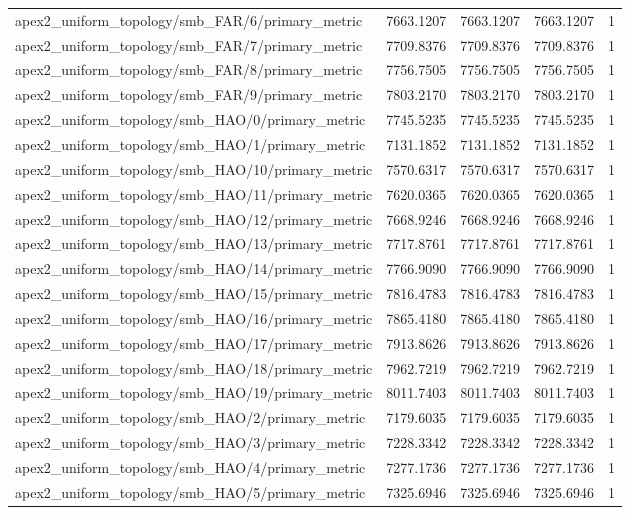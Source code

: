 \begin{table}[h]
\begin{tabular}{lrrrr}
apex2_uniform_topology/smb_FAR/6/primary_metric & 7663.1207 & 7663.1207 & 7663.1207 & 1 \\
apex2_uniform_topology/smb_FAR/7/primary_metric & 7709.8376 & 7709.8376 & 7709.8376 & 1 \\
apex2_uniform_topology/smb_FAR/8/primary_metric & 7756.7505 & 7756.7505 & 7756.7505 & 1 \\
apex2_uniform_topology/smb_FAR/9/primary_metric & 7803.2170 & 7803.2170 & 7803.2170 & 1 \\
apex2_uniform_topology/smb_HAO/0/primary_metric & 7745.5235 & 7745.5235 & 7745.5235 & 1 \\
apex2_uniform_topology/smb_HAO/1/primary_metric & 7131.1852 & 7131.1852 & 7131.1852 & 1 \\
apex2_uniform_topology/smb_HAO/10/primary_metric & 7570.6317 & 7570.6317 & 7570.6317 & 1 \\
apex2_uniform_topology/smb_HAO/11/primary_metric & 7620.0365 & 7620.0365 & 7620.0365 & 1 \\
apex2_uniform_topology/smb_HAO/12/primary_metric & 7668.9246 & 7668.9246 & 7668.9246 & 1 \\
apex2_uniform_topology/smb_HAO/13/primary_metric & 7717.8761 & 7717.8761 & 7717.8761 & 1 \\
apex2_uniform_topology/smb_HAO/14/primary_metric & 7766.9090 & 7766.9090 & 7766.9090 & 1 \\
apex2_uniform_topology/smb_HAO/15/primary_metric & 7816.4783 & 7816.4783 & 7816.4783 & 1 \\
apex2_uniform_topology/smb_HAO/16/primary_metric & 7865.4180 & 7865.4180 & 7865.4180 & 1 \\
apex2_uniform_topology/smb_HAO/17/primary_metric & 7913.8626 & 7913.8626 & 7913.8626 & 1 \\
apex2_uniform_topology/smb_HAO/18/primary_metric & 7962.7219 & 7962.7219 & 7962.7219 & 1 \\
apex2_uniform_topology/smb_HAO/19/primary_metric & 8011.7403 & 8011.7403 & 8011.7403 & 1 \\
apex2_uniform_topology/smb_HAO/2/primary_metric & 7179.6035 & 7179.6035 & 7179.6035 & 1 \\
apex2_uniform_topology/smb_HAO/3/primary_metric & 7228.3342 & 7228.3342 & 7228.3342 & 1 \\
apex2_uniform_topology/smb_HAO/4/primary_metric & 7277.1736 & 7277.1736 & 7277.1736 & 1 \\
apex2_uniform_topology/smb_HAO/5/primary_metric & 7325.6946 & 7325.6946 & 7325.6946 & 1 \\

\end{tabular}
\end{table}

